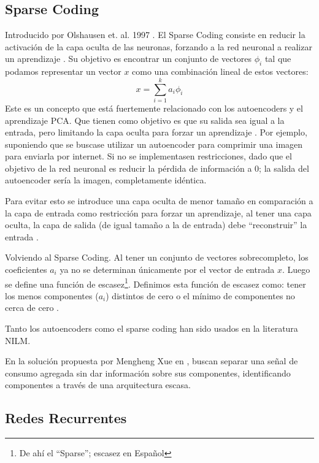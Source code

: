 \subsection{Sparse Coding}
Introducido por Olshausen et. al. 1997 \autocite{OLSHAUSEN}. El Sparse Coding consiste en reducir la activación de la capa oculta de las neuronas, forzando a la red neuronal a realizar un aprendizaje \autocite{stanfordSparse}.
Su objetivo es encontrar un conjunto de vectores $\phi_i$ tal que podamos representar un vector $x$ como una combinación lineal de estos vectores: 
$$
x = \sum_{i=1}^{k}a_i\phi_i
$$
Este es un concepto que está fuertemente relacionado con los autoencoders y el aprendizaje PCA. Que tienen como objetivo es que su salida sea igual a la entrada, pero limitando la capa oculta para forzar un aprendizaje \autocite{stanfordAutoEncoding}.
Por ejemplo, suponiendo que se buscase utilizar un autoencoder para comprimir una imagen para enviarla por internet. Si no se implementasen restricciones, dado que el objetivo de la red neuronal es reducir la pérdida de información a 0; la salida del autoencoder sería la imagen, completamente idéntica.

Para evitar esto se introduce una capa oculta de menor tamaño en comparación a la capa de entrada como restricción para forzar un aprendizaje, al tener una capa oculta, la capa de salida (de igual tamaño a la de entrada) debe \enquote{reconstruir} la entrada \autocite{stanfordAutoEncoding} .

Volviendo al Sparse Coding. Al tener un conjunto de vectores sobrecompleto, los coeficientes $a_i$ ya no se determinan únicamente por el vector de entrada $x$. Luego se define una función de escasez\footnote{De ahí el \enquote{Sparse}; escasez en Español}. Definimos esta función de escasez como: tener los menos componentes ($a_i$) distintos de cero o el mínimo de componentes no cerca de cero \autocite{stanfordSparse}.

Tanto los autoencoders como el sparse coding han sido usados en la literatura NILM.

En la solución propuesta por Mengheng Xue en \autocite{SparseCodingNILM}, buscan separar una señal de consumo agregada sin dar información sobre sus componentes, identificando componentes a través de una arquitectura escasa. 


\subsection{Redes Recurrentes}


